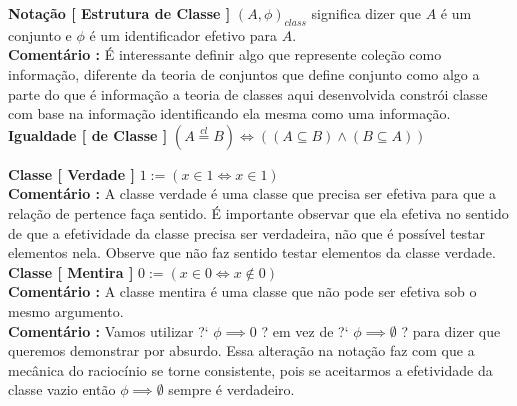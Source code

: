 \documentclass[10pt,a4paper]{report}
\begin{document}
\textbf{Notação [ Estrutura de Classe ]} $ (A,\phi)_{class} $ significa dizer que $A$ é um conjunto e $\phi$ é um identificador efetivo para $A$.\\

\textbf{Comentário :} É interessante definir algo que represente coleção como informação, diferente da teoria de conjuntos que define conjunto como algo a parte do que é informação a teoria de classes aqui desenvolvida constrói classe com base na informação identificando ela mesma como uma informação.\\

\textbf{Igualdade [ de Classe ]} $( A \overset{cl}{=} B) \iff ( (A \subseteq B) \wedge (B \subseteq A) ) $

\hspace{\baselineskip}

\textbf{Classe [ Verdade ]} $ 1 := ( x \in 1 \iff x \in 1 ) $\\

\textbf{Comentário :} A classe verdade é uma classe que precisa ser efetiva para que a relação de pertence faça sentido. É importante observar que ela efetiva no sentido de que a efetividade da classe precisa ser verdadeira, não que é possível testar elementos nela. Observe que não faz sentido testar elementos da classe verdade. \\

\textbf{Classe [ Mentira ]} $ 0 := ( x \in 0 \iff x \notin 0 ) $\\

\textbf{Comentário :} A classe mentira é uma classe que não pode ser efetiva sob o mesmo argumento.\\

\textbf{Comentário :} Vamos utilizar ?` $ \phi \implies 0 $ ? em vez de ?` $ \phi \implies \emptyset $ ? para dizer que queremos demonstrar por absurdo. Essa alteração na notação faz com que a mecânica do raciocínio se torne consistente, pois se aceitarmos a efetividade da classe vazio então $\phi \implies \emptyset$ sempre é verdadeiro.


\hspace{\baselineskip}
\end{document}
